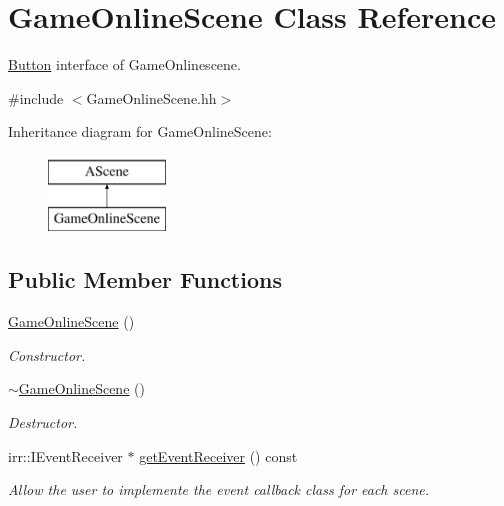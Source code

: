 \hypertarget{classGameOnlineScene}{}\section{Game\+Online\+Scene Class Reference}
\label{classGameOnlineScene}


\hyperlink{classButton}{Button} interface of Game\+Onlinescene.  




{\ttfamily \#include $<$Game\+Online\+Scene.\+hh$>$}

Inheritance diagram for Game\+Online\+Scene\+:\begin{figure}[H]
\begin{center}
\leavevmode
\includegraphics[height=2.000000cm]{classGameOnlineScene}
\end{center}
\end{figure}
\subsection*{Public Member Functions}
\begin{DoxyCompactItemize}
\item 
\hyperlink{classGameOnlineScene_a057362d043c386aa2b6789baf548fa09}{Game\+Online\+Scene} ()
\begin{DoxyCompactList}\small\item\em Constructor. \end{DoxyCompactList}\item 
\hyperlink{classGameOnlineScene_a59b127983ae2338edcf0b8bd86ff9f96}{$\sim$\+Game\+Online\+Scene} ()
\begin{DoxyCompactList}\small\item\em Destructor. \end{DoxyCompactList}\item 
irr\+::\+I\+Event\+Receiver $\ast$ \hyperlink{classGameOnlineScene_a00ce9773db4f1886fc463b023cbf63f9}{get\+Event\+Receiver} () const
\begin{DoxyCompactList}\small\item\em Allow the user to implemente the event callback class for each scene. \end{DoxyCompactList}\end{DoxyCompactItemize}


